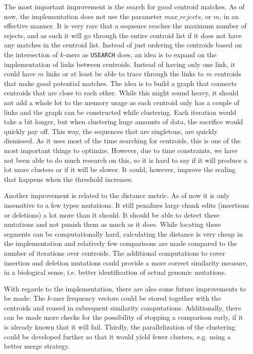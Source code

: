 The most important improvement is the search for good centroid matches. As of
now, the implementation does not use the parameter $max\_rejects$, or $m$, in
an effective manner. It is very rare that a sequence reaches the maximum
number of rejects, and as such it will go through the entire centroid list if
it does not have any matches in the centroid list. Instead of just ordering
the centroids based on the intersection of $k$-mers as \texttt{USEARCH} does,
an idea is to expand on the implementation of links between centroids. Instead
of having only one link, it could have $m$ links or at least be able to trace
through the links to $m$ centroids that make good potential matches. The idea
is to build a graph that connects centroids that are close to each other.
While this might sound heavy, it should not add a whole lot to the memory
usage as each centroid only has a couple of links and the graph can be
constructed while clustering. Each iteration would take a bit longer, but when
clustering huge amounts of data, the sacrifice would quickly pay off. This
way, the sequences that are singletons, are quickly dismissed. As it uses most
of the time searching for centroids, this is one of the most important things
to optimize. However, due to time constraints, we have not been able to do
much research on this, so it is hard to say if it will produce a lot more
clusters or if it will be slower. It could, however, improve the scaling that
happens when the threshold increases.

Another improvement is related to the distance metric. As of now it is only
insensitive to a few types mutations. It still penalizes large chunk edits
(insertions or deletions) a lot more than it should. It should be able to
detect these mutations and not punish them as much as it does. While locating
these segments can be computationally hard, calculating the distance is very
cheap in the implementation and relatively few comparisons are made compared to
the number of iterations over centroids. The additional computations to cover
insertion and deletion mutations could provide a more correct similarity
measure, in a biological sense, i.e. better identification of actual genomic
mutations.

With regards to the implementation, there are also some future improvements to
be made: The $k$-mer frequency vectors could be stored together with the
centroids and reused in subsequent similarity computations. Additionally, there
can be made more checks for the possibility of stopping a comparison early, if
it is already known that it will fail. Thirdly, the parallelization of the
clustering could be developed further so that it would yield fewer clusters,
e.g. using a better merge strategy.
